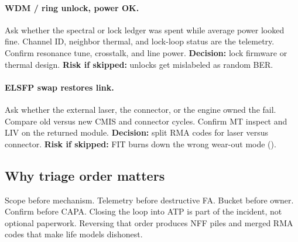 \paragraph{WDM / ring unlock, power OK.}
Ask whether the spectral or lock ledger was spent while average power looked
fine. Channel ID, neighbor thermal, and lock-loop status are the telemetry.
Confirm resonance tune, crosstalk, and line power. \textbf{Decision:} lock
firmware or thermal design. \textbf{Risk if skipped:} unlocks get mislabeled
as random BER.

\paragraph{ELSFP swap restores link.}
Ask whether the external laser, the connector, or the engine owned the fail.
Compare old versus new CMIS and connector cycles. Confirm MT inspect and LIV
on the returned module. \textbf{Decision:} split RMA codes for laser versus
connector. \textbf{Risk if skipped:} FIT burns down the wrong wear-out mode
().

\subsection{Why triage order matters}

Scope before mechanism. Telemetry before destructive FA. Bucket before owner.
Confirm before CAPA. Closing the loop into ATP is part of the incident, not
optional paperwork. Reversing that order produces NFF piles and merged RMA
codes that make life models dishonest.

